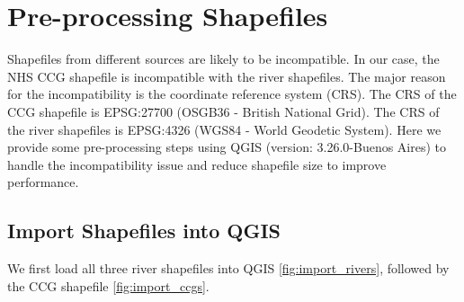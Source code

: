 \appendix

\section{Pre-processing Shapefiles}

Shapefiles from different sources are likely to be incompatible. In our case, the NHS CCG shapefile is incompatible with the river shapefiles. The major reason for the incompatibility is the coordinate reference system (CRS). The CRS of the CCG shapefile is EPSG:27700 (OSGB36 - British National Grid). The CRS of the river shapefiles is EPSG:4326 (WGS84 - World Geodetic System). Here we provide some pre-processing steps using QGIS (version: 3.26.0-Buenos Aires) \cite{qgisWelcome} to handle the incompatibility issue and reduce shapefile size to improve performance.

\subsection{Import Shapefiles into QGIS}
We first load all three river shapefiles into QGIS \autoref{fig:import_rivers}, followed by the CCG shapefile \autoref{fig:import_ccgs}.

